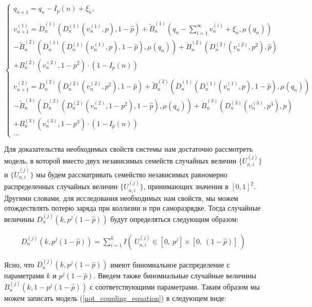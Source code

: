 \documentclass[10pt, reqno]{amsart}
\begin{document}
\small
\begin{equation}
\begin{cases}
q_{n+1} = q_{n} − I_{p}(n) + \xi_{n}, \\\\
v_{n+1}^{(1)} = \dot{D}_{n}^{(1)}(D_{n}^{(1)}(v_{n}^{(1)}, p), 1-\hat{p}) + \widetilde{B}_{n}^{(1)}(q_{n} − \sum_{i=1}^{\infty}v_{n}^{(i)} + \xi_{n}, \mu(q_{n})) \\- \widetilde{B}_{n}^{(2)}(\dot{D}_{n}^{(1)}(D_{n}^{(1)}(v_{n}^{(1)}, p), 1-\hat{p}), \mu(q_{n})) + \dot{B}_{n}^{(2)}(D_{n}^{(2)}(v_{n}^{(2)}, p^{2}), \hat{p}) \\+ B_{n}^{(2)}(v_{n}^{(2)}, 1-p^{2})\cdot(1-I_{p}(n)) \\\\
v_{n+1}^{(2)} = \dot{D}_{n}^{(2)}(D_{n}^{(2)}(v_{n}^{(2)}, p^{2}), 1-\hat{p}) + \widetilde{B}_{n}^{(2)}(\dot{D}_{n}^{(1)}(D_{n}^{(1)}(v_{n}^{(1)}, p), 1-\hat{p}), \mu(q_{n}))\\- \widetilde{B}_{n}^{(3)}(\dot{D}_{n}^{(2)}(D_{n}^{(2)}(v_{n}^{(2)}, 1-p^{2}), 1-\hat{p}), \mu(q_{n})) + \dot{B}_{n}^{(3)}(D_{n}^{(3)}(v_{n}^{(3)}, p^{3}), \hat{p}) \\+ B_{n}^{(3)}(v_{n}^{(3)}, 1-p^{3})\cdot(1-I_{p}(n))\\
...
\end{cases}
\label{not_coupling_equation}
\end{equation}
\normalsize

Для доказательства необходимых свойств системы нам достаточно рассмотреть модель, в которой вместо двух независимых семейств случайных величин $\{U^{(j)}_{n,i}\}$ и $\{\dot{U}^{(j)}_{n,i}\}$ мы будем рассматривать семейство независимых равномерно распределенных случайных величин $\{U^{(j)}_{n,i}\}$, принимающих значения в $[0, 1]^{2}$. Другими словами, для исследования необходимых нам свойств, мы можем отождествлять потерю заряда при коллизии и при саморазрядке. Тогда случайные величины $D^{(j)}_{n}(k, p^{j}(1-\hat{p}))$ будут определяться следующим образом:

\begin{align*}
    D^{(j)}_{n}(k, p^{j}(1-\hat{p})) = \sum_{i=1}^{k}I(\:U^{(j)}_{n,i} \in [0,\: p^{j}] \times [0,\: (1-\hat{p})]\:)
\end{align*}

Ясно, что $D^{(j)}_{n}(k, p^{j}(1-\hat{p}))$ имеют биномиальное распределение с параметрами $k$ и $p^{j}(1-\hat{p})$. Введем также биномиальные случайные величины $B^{(j)}_{n}(k, 1 - p^{j}(1-\hat{p}))$ с соответствующими параметрами. Таким образом мы можем записать модель (\ref{not_coupling_equation}) в следующем виде:
\end{document}
